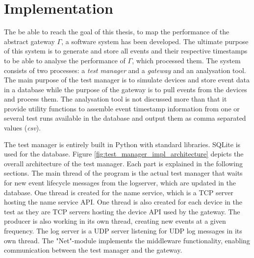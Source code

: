 \chapter{Implementation}
\label{ch:implementation}

The be able to reach the goal of this thesis, to map the performance of the
abstract gateway $\Gamma$, a software system has been developed. The ultimate
purpose of this system is to generate and store all events and their respective
timestamps to be able to analyse the performance of $\Gamma$, which processed
them. The system consists of two processes: a \textit{test manager} and a
\textit{gateway} and an analysation tool. The main purpose of the test manager
is to simulate devices and store event data in a database while the purpose of
the gateway is to pull events from the devices and process them. The
analysation tool is not discussed more than that it provide utility functions
to assemble event timestamp information from one or several test runs available
in the database and output them as comma separated values (\textit{csv}).

The test manager is entirely built in Python with standard libraries. SQLite is
used for the database. Figure \ref{fig:test_manager_impl_architecture} depicts
the overall architecture of the test manager. Each part is explained in the
following sections. The main thread of the program is the actual test manager
that waits for new event lifecycle messages from the logserver, which are
updated in the database. One thread is created for the name service, which is a
TCP server hosting the name service API. One thread is also created for each
device in the test as they are TCP servers hosting the device API used by the
gateway. The producer is also working in its own thread, creating new events at
a given frequency. The log server is a UDP server listening for UDP log
messages in its own thread. The "Net"-module implements the middleware
functionality, enabling communication between the test manager and the gateway.

